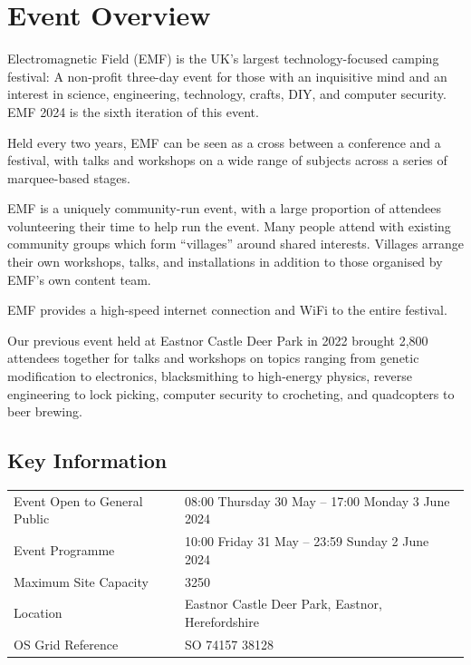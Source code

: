 \section{Event Overview}

Electromagnetic Field (EMF) is the UK's largest technology-focused camping festival:
A non-profit three-day event for those with an inquisitive mind and an interest in
science, engineering, technology, crafts, DIY, and computer security. EMF 2024 is the
sixth iteration of this event.

Held every two years, EMF can be seen as a cross between a conference and a
festival, with talks and workshops on a wide range of subjects across a series
of marquee-based stages.

EMF is a uniquely community-run event, with a large proportion of attendees volunteering
their time to help run the event. Many people attend with existing community groups which
form ``villages'' around shared interests. Villages arrange their own workshops, talks, and
installations in addition to those organised by EMF's own content team.

EMF provides a high-speed internet connection and WiFi to the entire festival.

Our previous event held at Eastnor Castle Deer Park in 2022 brought 2,800 attendees
together for talks and workshops on topics ranging from genetic modification to
electronics, blacksmithing to high-energy physics, reverse engineering to lock picking,
computer security to crocheting, and quadcopters to beer brewing.

\subsection{Key Information}

\begin{tabular}{l l}
    Event Open to General Public & 08:00 Thursday 30 May  -- 17:00 Monday 3 June 2024 \\
    Event Programme              & 10:00 Friday 31 May -- 23:59 Sunday 2 June 2024    \\
    Maximum Site Capacity        & 3250                                               \\
    Location                     & Eastnor Castle Deer Park, Eastnor, Herefordshire   \\
    OS Grid Reference            & SO 74157 38128                                     \\
\end{tabular}

